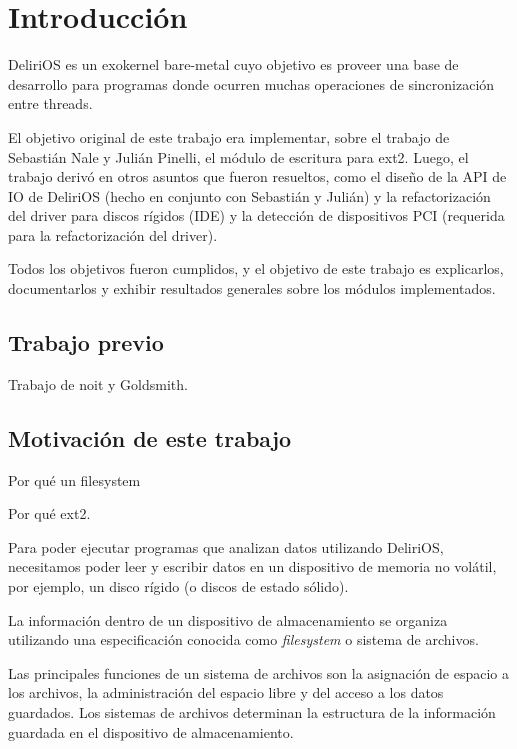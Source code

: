 
\chapter{Introducción}
DeliriOS es un exokernel bare-metal cuyo objetivo es proveer una base de desarrollo para programas donde ocurren muchas operaciones de sincronización entre threads.

El objetivo original de este trabajo era implementar, sobre el trabajo de Sebastián Nale y Julián Pinelli, el módulo de escritura para ext2.
Luego, el trabajo derivó en otros asuntos que fueron resueltos, como el diseño de la API de IO de DeliriOS (hecho en conjunto con Sebastián y Julián) y la refactorización del driver para discos rígidos (IDE) y la detección de dispositivos PCI (requerida para la refactorización del driver).

Todos los objetivos fueron cumplidos, y el objetivo de este trabajo es explicarlos, documentarlos y exhibir resultados generales sobre los módulos implementados.
\newpage

\section{Trabajo previo}
\begin{puntos}
  \item Trabajo de noit y Goldsmith.
\end{puntos}



\section{Motivación de este trabajo}

\begin{puntos}
  \item Por qué un filesystem
  \item Por qué ext2.
\end{puntos}

Para poder ejecutar programas que analizan datos utilizando DeliriOS, necesitamos poder leer y escribir datos en un dispositivo de memoria no volátil, por ejemplo, un disco rígido (o discos de estado sólido).

La información dentro de un dispositivo de almacenamiento se organiza utilizando una especificación conocida como \emph{filesystem} o sistema de archivos. 

Las principales funciones de un sistema de archivos son la asignación de espacio a los archivos, la administración del espacio libre y del acceso a los datos guardados.
Los sistemas de archivos determinan la estructura de la información guardada en el dispositivo de almacenamiento.

